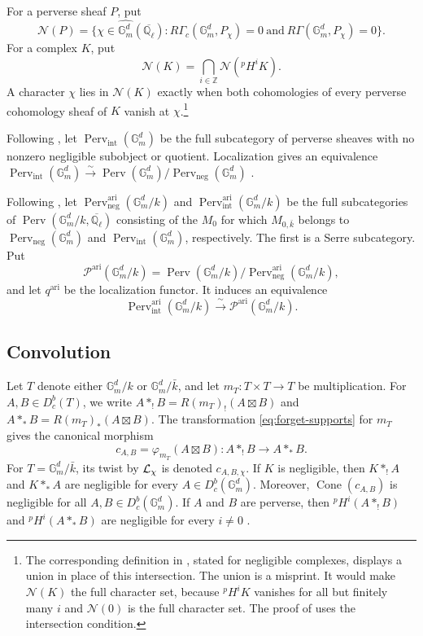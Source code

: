 \documentclass[12pt,reqno]{amsart}
\theoremstyle{definition}
\theoremstyle{plain}
\theoremstyle{definition}
\theoremstyle{remark}
\newcommand{\bbG}{\mathbb{G}}  \newcommand{\bbH}{\mathbb{H}}
\newcommand{\bbQ}{\mathbb{Q}}  \newcommand{\bbR}{\mathbb{R}}
\newcommand{\ol}[1]{\overline{#1}}
\newcommand{\Ql}{\bbQ_{\ell}}
\newcommand{\Db}{D^b_c}
\newcommand{\Gm}{\bbG_m}
\newcommand{\Perv}{\operatorname{Perv}}
\newcommand{\Cone}{\operatorname{Cone}}
\begin{document}
For a perverse sheaf \(P\), put
\[
 \mathcal N(P)=\bigl\{\chi\in\widehat{\Gm^d}(\ol\Ql):
 R\Gamma_c(\Gm^d,P_\chi)=0\ \text{and}\ R\Gamma(\Gm^d,P_\chi)=0\bigr\}.
\]
For a complex \(K\), put
\[
        \mathcal N(K)=\bigcap_{i\in\mathbb Z}\mathcal N({}^pH^iK).
\]
A character \(\chi\) lies in \(\mathcal N(K)\) exactly when both cohomologies of every perverse
cohomology sheaf of \(K\) vanish at \(\chi\).\footnote{The corresponding definition in
\cite[\S3.4]{ForeyFresanKowalski2021}, stated for negligible complexes, displays a union in place of
this intersection.  The union is
a misprint.  It would make \(\mathcal N(K)\) the full character set, because \({}^pH^iK\) vanishes
for all but finitely many \(i\) and \(\mathcal N(0)\) is the full character set.  The proof of
\cite[Lem.~3.28]{ForeyFresanKowalski2021} uses the intersection condition.}

Following \cite[Def.-Prop.~3.7.2]{GabberLoeser1996}, let \(\Perv_{\mathrm{int}}(\Gm^d)\) be the full
subcategory of perverse sheaves with no nonzero negligible subobject or quotient.  Localization gives an
equivalence
\(\Perv_{\mathrm{int}}(\Gm^d)\xrightarrow{\sim}\Perv(\Gm^d)/\Perv_{\mathrm{neg}}(\Gm^d)\)
\cite[Def.-Prop.~3.7.2]{GabberLoeser1996}.

Following \cite[\S3.8]{ForeyFresanKowalski2021}, let
\(\Perv_{\mathrm{neg}}^{\mathrm{ari}}(\Gm^d/k)\) and
\(\Perv_{\mathrm{int}}^{\mathrm{ari}}(\Gm^d/k)\) be the full subcategories of
\(\Perv(\Gm^d/k,\ol\Ql)\) consisting of the \(M_0\) for which \(M_{0,\bar k}\) belongs to
\(\Perv_{\mathrm{neg}}(\Gm^d)\) and \(\Perv_{\mathrm{int}}(\Gm^d)\), respectively.  The first is a Serre
subcategory.  Put
\[
        \mathcal P^{\mathrm{ari}}(\Gm^d/k)
        =\Perv(\Gm^d/k)/\Perv_{\mathrm{neg}}^{\mathrm{ari}}(\Gm^d/k),
\]
and let \(q^{\mathrm{ari}}\) be the localization functor.  It induces an equivalence
\[
        \Perv_{\mathrm{int}}^{\mathrm{ari}}(\Gm^d/k)
        \xrightarrow{\ \sim\ }
        \mathcal P^{\mathrm{ari}}(\Gm^d/k).
\]

\subsection{Convolution}
\label{sec:convolution}

Let \(T\) denote either \(\Gm^d/k\) or \(\Gm^d/\bar k\), and let
\(m_T\colon T\times T\to T\) be multiplication.  For \(A,B\in\Db(T)\), we write
\(A\ast_!B=R(m_T)_!(A\boxtimes B)\) and \(A\ast_*B=R(m_T)_*(A\boxtimes B)\).  The transformation
\eqref{eq:forget-supports} for \(m_T\) gives the canonical morphism
\begin{equation}
\label{eq:convolution-comparison}
        c_{A,B}=\varphi_{m_T}(A\boxtimes B)\colon A\ast_!B\longrightarrow A\ast_*B.
\end{equation}
For \(T=\Gm^d/\bar k\), its twist by \(\mathcal{L}_\chi\) is denoted \(c_{A,B,\chi}\).
If \(K\) is negligible, then \(K\ast_!A\) and \(K\ast_*A\) are negligible for every
\(A\in\Db(\Gm^d)\).  Moreover, \(\Cone(c_{A,B})\) is negligible for all \(A,B\in\Db(\Gm^d)\).  If \(A\)
and \(B\) are perverse, then
\({}^pH^i(A\ast_!B)\) and \({}^pH^i(A\ast_*B)\) are negligible for every \(i\neq0\)
\cite[Prop.~3.6.4]{GabberLoeser1996}.
\end{document}
